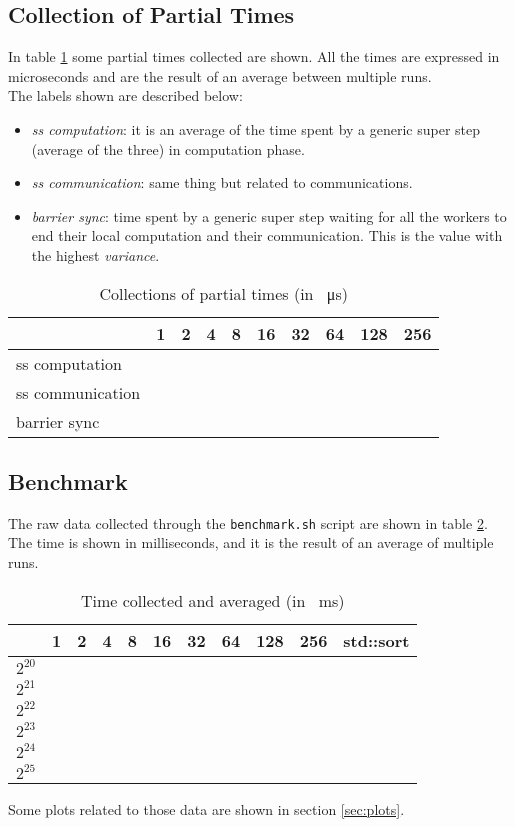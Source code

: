 \documentclass[]{article}
\def\code#1{\texttt{#1}}
\begin{document}
\subsection{Collection of Partial Times}
\label{sec:tseq}
In table \ref{tab:tseq} some partial times collected are shown. All the times are expressed in microseconds and are the result of an average between multiple runs.\\
The labels shown are described below:
\begin{itemize}
	\item \emph{ss computation}: it is an average of the time spent by a generic super step (average of the three) in computation phase.
	\item \emph{ss communication}: same thing but related to communications.
	\item \emph{barrier sync}: time spent by a generic super step waiting for all the workers to end their local computation and their communication. This is the value with the highest \emph{variance}.
\end{itemize}
\begin{table}[H]
	\centering
	\begin{tabular}{l|*{9}r}
		\toprule
		\diagbox{phase}{$\mathit{nw}$} 
		& 1 & 2 & 4 & 8 & 16 & 32 & 64 & 128 & 256 \\
		\midrule
		ss computation \\
		ss communication \\
		barrier sync \\
		\bottomrule
	\end{tabular}%
	\caption{Collections of partial times (in \SI{}{\micro \second})}
	\label{tab:tseq}%
\end{table}%

\subsection{Benchmark}
\label{sec:benchmark}
The raw data collected through the \code{benchmark.sh} script are shown in table \ref{tab:benchmark}. The time is shown in milliseconds, and it is the result of an average of multiple runs.
\begin{table}[H]
	\centering
	\begin{tabular}{l|*{10}r}
		\toprule
		\diagbox{$n$}{$\mathit{nw}$} 
		& 1 & 2 & 4 & 8 & 16 & 32 & 64 & 128 & 256 & std::sort \\
		\midrule
		$2^{20}$ \\
		$2^{21}$ \\
		$2^{22}$ \\
		$2^{23}$ \\
		$2^{24}$ \\
		$2^{25}$ \\
		\bottomrule
	\end{tabular}%
	\caption{Time collected and averaged (in \SI{}{\milli \second})}
	\label{tab:benchmark}
\end{table}%
Some plots related to those data are shown in section \ref{sec:plots}.
\end{document}
